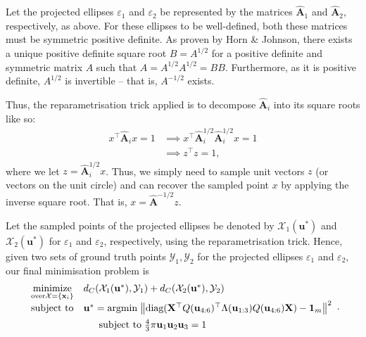 \documentclass{article}
\begin{document}
Let the projected ellipses $\varepsilon_1$ and $\varepsilon_2$ be represented by the matrices $\hat{\mathbf A}_1$ and $\hat{\mathbf A}_2$, respectively, as above. For these ellipses to be well-defined, both these matrices must be symmetric positive definite. As proven by Horn \& Johnson, there exists a unique positive definite square root $B=A^{1/2}$ for a positive definite and symmetric matrix $A$ such that $A= A^{1/2} A^{1/2}  = BB$. Furthermore, as it is positive definite, $A^{1/2}$ is invertible -- that is, $A^{-1/2}$ exists.

Thus, the reparametrisation trick applied is to decompose $\hat{\mathbf A}_i$ into its square roots like so:
\begin{align}
    x^\top \hat{\mathbf A}_i x = 1 &\implies x^\top \hat{\mathbf A}^{1/2}_i \hat{\mathbf A}^{1/2}_i x = 1 \\
    &\implies z^\top z = 1,
\end{align}
where we let $z = \hat{\mathbf A}^{1/2}_i x$. Thus, we simply need to sample unit vectors $z$ (or vectors on the unit circle) and can recover the sampled point $x$ by applying the inverse square root. That is, $x = \hat{\mathbf A}^{-1/2}z$.


Let the sampled points of the projected ellipses be denoted by $\mathcal X_1(\mathbf u^*)$ and $\mathcal X_2(\mathbf u^*)$ for $\varepsilon_1$ and $\varepsilon_2$, respectively, using the reparametrisation trick. Hence, given two sets of ground truth points $\mathcal Y_1, \mathcal Y_2$ for the projected ellipses $\varepsilon_1$ and $\varepsilon_2$, our final minimisation problem is
$$
\begin{array}{ll}
    \underset{\text{over} \mathcal X = \{ \mathbf x_i \}}{\text{minimize}} &  d_C(\mathcal X_1(\mathbf u^*), \mathcal Y_1) + d_C(\mathcal X_2(\mathbf u^*), \mathcal Y_2) \\[0.5em]
  \text{subject to} & \mathbf u^* = \text{argmin} \; \!\left\Vert \text{diag}(\mathbf X^\top Q(\mathbf u_{4:6}) ^\top \Lambda(\mathbf u_{1:3}) Q(\mathbf u_{4:6}) \mathbf X) - \mathbf 1_m \right\Vert ^2 \\[0.5em]
  & \hphantom{y =} \text{subject to} \;  \frac{4}{3} \pi \mathbf u_1 \mathbf u_2 \mathbf u_3 = 1
\end{array}.
$$
\end{document}

